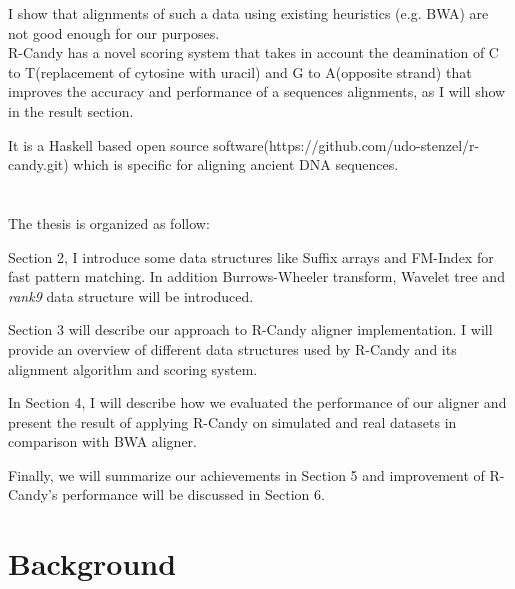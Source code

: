 \documentclass[11pt,a4paper]{report}
\begin{document}
I show that alignments of such a data using existing heuristics (e.g. BWA) are not good enough for our purposes.\\ 

R-Candy has a novel scoring system that takes in account the deamination of C to T(replacement of cytosine with uracil) and G to A(opposite strand) that improves the accuracy and performance of a sequences alignments, as I will show in the result section. 

It is a Haskell based open source software(https://github.com/udo-stenzel/r-candy.git) which is specific for aligning ancient DNA sequences.
\\\\\\

The thesis is organized as follow:
 
Section 2, I introduce some data structures like Suffix arrays and FM-Index for fast pattern matching. In addition Burrows-Wheeler transform, Wavelet tree and \emph{rank9} data structure will be introduced.

Section 3 will describe our approach to R-Candy aligner implementation.
I will provide an overview of different data structures used by R-Candy and its alignment algorithm and scoring system.

In Section 4, I will describe how we evaluated the performance of our aligner and present the result of applying R-Candy on simulated and real datasets in comparison with BWA aligner.

Finally, we will summarize our achievements in Section 5 and improvement of R-Candy's performance will be discussed in Section 6. 



\clearpage


\section{Background } \label{Background }
\end{document}

